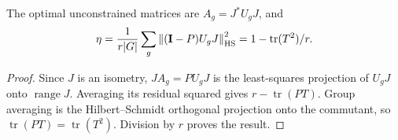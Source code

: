 \begin{spectrallemma}
\label{sp:regression}
The optimal unconstrained matrices are $A_g=J^*U_gJ$, and
\begin{equation}
 \eta=\frac1{r|G|}\sum_g\left\lVert (\mathbf{I}-P)U_gJ\right\rVert_{\mathrm{HS}}^2
 =1-\operatorname{tr}(T^2)/r.
 \label{sp:eta}
\end{equation}
\end{spectrallemma}
\begin{proof}
Since $J$ is an isometry, $JA_g=PU_gJ$ is the least-squares projection of $U_gJ$ onto $\operatorname{range}J$. Averaging its residual squared gives $r-\operatorname{tr}(PT)$. Group averaging is the Hilbert--Schmidt orthogonal projection onto the commutant, so $\operatorname{tr}(PT)=\operatorname{tr}(T^2)$. Division by $r$ proves the result.
\end{proof}

